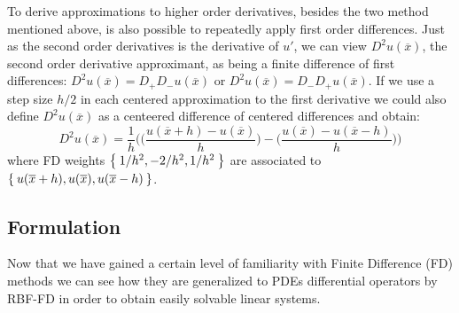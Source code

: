 To derive approximations to higher order derivatives, besides the two method mentioned above, is also possible to repeatedly apply first order differences. Just as the second order derivatives is the derivative of $u'$, we can view $D^2u(\overline{x})$, the second order derivative approximant, as being a finite difference of first differences: $D^2 u(\overline{x}) = D_+ D_- u(\overline{x})$ or $D^2 u(\overline{x}) = D_- D_+ u(\overline{x})$. If we use a step size $h/2$ in each centered approximation to the first derivative we could also define $D^2 u(\overline{x})$ as a centeered difference of centered differences and obtain:
\begin{equation}
	D^2 u(\overline{x}) = \frac{1}{h} \Biggl( \biggl( \frac{u(\overline{x}+h) - u(\overline{x})}{h} \biggr) - \biggl( \frac{u(\overline{x}) - u(\overline{x}-h)}{h} \biggr) \Biggr)
\end{equation}
where FD weights $\Set{1/h^2, -2/h^2, 1/h^2}$ are associated to $\Set{u(\overline{x}+h), u(\overline{x}), u(\overline{x}-h)}$.


\subsection{Formulation}
\label{subsec:RBF-FD_formulation}

Now that we have gained a certain level of familiarity with Finite Difference  (FD) methods we can see how they are generalized to PDEs differential operators by RBF-FD in order to obtain easily solvable linear systems.

